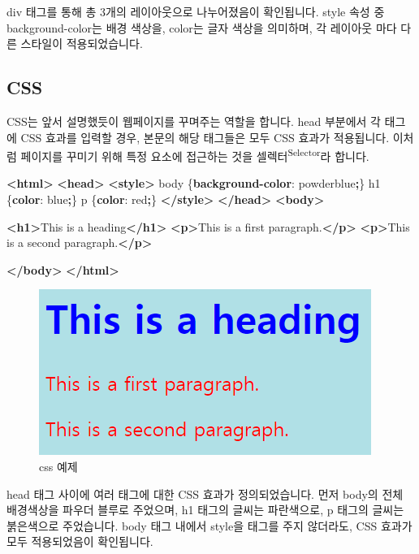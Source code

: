 \documentclass[]{book}
\newenvironment{Shaded}{\begin{snugshade}}{\end{snugshade}}
\newcommand{\ConstantTok}[1]{\textcolor[rgb]{0.00,0.00,0.00}{#1}}
\newcommand{\KeywordTok}[1]{\textcolor[rgb]{0.13,0.29,0.53}{\textbf{#1}}}
\newcommand{\NormalTok}[1]{#1}
\newcommand{\OperatorTok}[1]{\textcolor[rgb]{0.81,0.36,0.00}{\textbf{#1}}}
\begin{document}
div 태그를 통해 총 3개의 레이아웃으로 나누어졌음이 확인됩니다. style 속성 중 background-color는 배경 색상을, color는 글자 색상을 의미하며, 각 레이아웃 마다 다른 스타일이 적용되었습니다.

\hypertarget{css}{%
\subsection{CSS}\label{css}}

CSS는 앞서 설명했듯이 웹페이지를 꾸며주는 역할을 합니다. head 부분에서 각 태그에 CSS 효과를 입력할 경우, 본문의 해당 태그들은 모두 CSS 효과가 적용됩니다. 이처럼 페이지를 꾸미기 위해 특정 요소에 접근하는 것을 셀렉터\textsuperscript{Selector}라 합니다.

\begin{Shaded}
\begin{Highlighting}[]
\KeywordTok{<html>}
\KeywordTok{<head>}
\KeywordTok{<style>}
\NormalTok{body \{}\KeywordTok{background-color}\NormalTok{: }\ConstantTok{powderblue}\OperatorTok{;}\NormalTok{\}}
\NormalTok{h1   \{}\KeywordTok{color}\NormalTok{: }\ConstantTok{blue}\OperatorTok{;}\NormalTok{\}}
\NormalTok{p    \{}\KeywordTok{color}\NormalTok{: }\ConstantTok{red}\OperatorTok{;}\NormalTok{\}}
\KeywordTok{</style>}
\KeywordTok{</head>}
\KeywordTok{<body>}

\KeywordTok{<h1>}\NormalTok{This is a heading}\KeywordTok{</h1>}
\KeywordTok{<p>}\NormalTok{This is a first paragraph.}\KeywordTok{</p>}
\KeywordTok{<p>}\NormalTok{This is a second paragraph.}\KeywordTok{</p>}

\KeywordTok{</body>}
\KeywordTok{</html>}
\end{Highlighting}
\end{Shaded}

\begin{figure}

{\centering \includegraphics[width=0.5\linewidth]{images/html_8} 

}

\caption{css 예제}\label{fig:unnamed-chunk-22}
\end{figure}

head 태그 사이에 여러 태그에 대한 CSS 효과가 정의되었습니다. 먼저 body의 전체 배경색상을 파우더 블루로 주었으며, h1 태그의 글씨는 파란색으로, p 태그의 글씨는 붉은색으로 주었습니다. body 태그 내에서 style을 태그를 주지 않더라도, CSS 효과가 모두 적용되었음이 확인됩니다.
\end{document}
